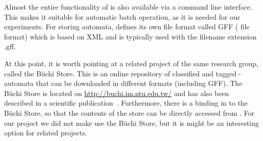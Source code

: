 Almost the entire functionality of \goal{} is also available via a command line interface. This makes it suitable for automatic batch operation, as it is needed for our experiments. For storing automata, \goal{} defines its own file format called GFF (\goal{} file format) which is based on XML and is typically used with the filename extension \textsf{.gff}.

At this point, it is worth pointing at a related project of the same research group, called the Büchi Store. This is an online repository of classified and tagged \om-automata that can be downloaded in different formats (including GFF). The Büchi Store is located on \url{http://buchi.im.ntu.edu.tw/} and has also been described in a scientific publication~\cite{2011_buchi_store}. Furthermore, there is a binding in \goal{} to the Büchi Store, so that the contents of the store can be directly accessed from \goal{}. For our project we did not make use the Büchi Store, but it is might be an interesting option for related projects.




